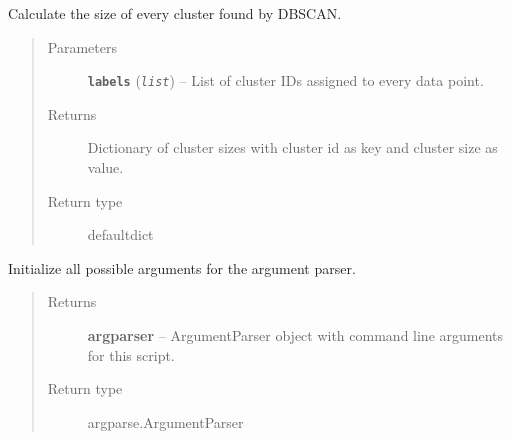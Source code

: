 \documentclass[letterpaper,10pt,english]{sphinxmanual}
\begin{document}

\begin{fulllineitems}
\label{src.clustering:src.clustering.cluster_mappings.get_cluster_size}
Calculate the size of every cluster found by DBSCAN.
\begin{quote}\begin{description}
\item[{Parameters}] \leavevmode
\textbf{\texttt{labels}} (\emph{\texttt{list}}) -- List of cluster IDs assigned to every data point.

\item[{Returns}] \leavevmode
Dictionary of cluster sizes with cluster id as key and cluster size as value.

\item[{Return type}] \leavevmode
defaultdict

\end{description}\end{quote}

\end{fulllineitems}


\begin{fulllineitems}
\label{src.clustering:src.clustering.cluster_mappings.init_argparser}
Initialize all possible arguments for the argument parser.
\begin{quote}\begin{description}
\item[{Returns}] \leavevmode
\textbf{argparser} -- ArgumentParser object with command line arguments for this script.

\item[{Return type}] \leavevmode
argparse.ArgumentParser

\end{description}\end{quote}

\end{fulllineitems}

\end{document}

